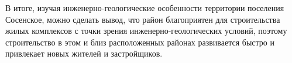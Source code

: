 В итоге, изучая инженерно-геологические особенности территории поселения Сосенское, 
можно сделать вывод, что район благоприятен для строительства жилых комплексов 
с точки зрения инженерно-геологических условий, поэтому строительство в этом и близ 
расположенных районах развивается быстро и привлекает новых жителей и застройщиков.